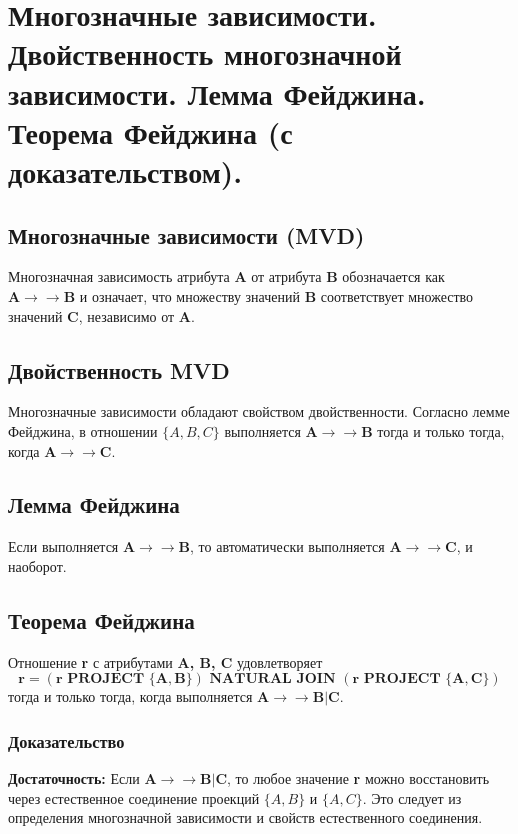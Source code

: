 \documentclass[a4paper,12pt]{article}
\begin{document}
\section{Многозначные зависимости. Двойственность многозначной зависимости. Лемма Фейджина. Теорема Фейджина (с доказательством).}

\subsection{Многозначные зависимости (MVD)}

Многозначная зависимость атрибута \textbf{A} от атрибута \textbf{B} обозначается как \(\mathbf{A \rightarrow\rightarrow B}\) и означает, что множеству значений \textbf{B} соответствует множество значений \textbf{C}, независимо от \textbf{A}.

\subsection{Двойственность MVD}

Многозначные зависимости обладают свойством двойственности. Согласно лемме Фейджина, в отношении \(\{A, B, C\}\) выполняется \(\mathbf{A \rightarrow\rightarrow B}\) тогда и только тогда, когда \(\mathbf{A \rightarrow\rightarrow C}\).

\subsection{Лемма Фейджина}

Если выполняется \(\mathbf{A \rightarrow\rightarrow B}\), то автоматически выполняется \(\mathbf{A \rightarrow\rightarrow C}\), и наоборот.

\subsection{Теорема Фейджина}

Отношение \textbf{r} с атрибутами \textbf{A, B, C} удовлетворяет
\[
\mathbf{r = (r \text{ PROJECT } \{A, B\}) \text{ NATURAL JOIN } (r \text{ PROJECT } \{A, C\})}
\]
тогда и только тогда, когда выполняется \(\mathbf{A \rightarrow\rightarrow B | C}\).

\subsubsection{Доказательство}

\textbf{Достаточность:}  
Если \(\mathbf{A \rightarrow\rightarrow B | C}\), то любое значение \textbf{r} можно восстановить через естественное соединение проекций \(\{A, B\}\) и \(\{A, C\}\). Это следует из определения многозначной зависимости и свойств естественного соединения.
\end{document}
